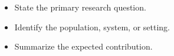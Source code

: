 \begin{itemize}
  \item State the primary research question.
  \item Identify the population, system, or setting.
  \item Summarize the expected contribution.
\end{itemize}


